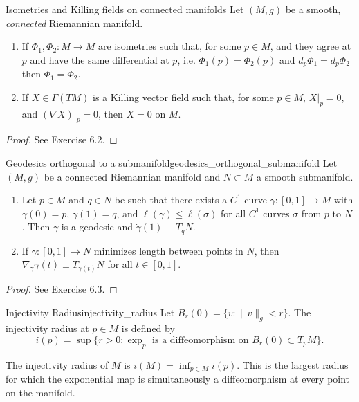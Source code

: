 \begin{colorlem}{Isometries and Killing fields on connected manifolds}{}
Let \((M,g)\) be a smooth, \emph{connected} Riemannian manifold.
\begin{enumerate}
    \item If \(\Phi_1,\Phi_2 : M \to M\) are isometries such that, for some \(p \in M\), and they agree at \(p\) and have the same differential at \(p\), i.e. $\Phi_1(p)=\Phi_2(p)$ and $d_p\Phi_1=d_p\Phi_2$ then \(\Phi_1=\Phi_2\).

    \item If \(X \in \Gamma(TM)\) is a Killing vector field such that, for some \(p \in M\), $X|_p=0$, and $(\nabla X)|_p=0$, then \(X=0\) on \(M\).
\end{enumerate}
\end{colorlem}

\begin{proof}
See Exercise 6.2.
\end{proof}

\begin{colorlem}{Geodesics orthogonal to a submanifold}{geodesics_orthogonal_submanifold}
Let \((M,g)\) be a connected Riemannian manifold and \(N \subset M\) a smooth submanifold.  

\begin{enumerate}[itemsep=0pt, topsep=0pt]
    \item Let \(p \in M\) and \(q \in N\) be such that there exists a \(C^1\) curve \(\gamma:[0,1]\to M\) with \(\gamma(0)=p\), \(\gamma(1)=q\), and \(\ell(\gamma) \le \ell(\sigma)\) for all \(C^1\) curves \(\sigma\) from \(p\) to \(N\). Then \(\gamma\) is a geodesic and \(\dot\gamma(1) \perp T_{q}N\).  
    \item If \(\gamma:[0,1]\to N\) minimizes length between points in \(N\), then \(\nabla_{\dot\gamma}\dot\gamma(t) \perp T_{\gamma(t)}N\) for all \(t \in [0,1]\).
\end{enumerate}
\end{colorlem}

\begin{proof}
See Exercise 6.3.
\end{proof}












\begin{colordef}{Injectivity Radius}{injectivity_radius}
Let $B_r(0) = \{ v : \|v\|_g < r \}$. The injectivity radius at $p \in M$ is defined by
\[
i(p) = \sup\{r > 0 : \exp_p \text{ is a diffeomorphism on } B_r(0) \subset T_p M\}.
\]
\end{colordef}
The injectivity radius of $M$ is $i(M) = \inf_{p \in M} i(p)$. This is the largest radius for which the exponential map is simultaneously a diffeomorphism at every point on the manifold.

